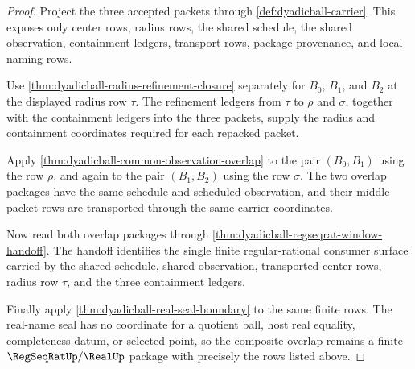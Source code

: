 \begin{proof}
Project the three accepted packets through \autoref{def:dyadicball-carrier}.
This exposes only center rows, radius rows, the shared schedule, the shared
observation, containment ledgers, transport rows, package provenance, and local
naming rows.

Use \autoref{thm:dyadicball-radius-refinement-closure} separately for $B_0$,
$B_1$, and $B_2$ at the displayed radius row $\tau$. The refinement ledgers
from $\tau$ to $\rho$ and $\sigma$, together with the containment ledgers into
the three packets, supply the radius and containment coordinates required for
each repacked packet.

Apply \autoref{thm:dyadicball-common-observation-overlap} to the pair
$(B_0,B_1)$ using the row $\rho$, and again to the pair $(B_1,B_2)$ using the
row $\sigma$. The two overlap packages have the same schedule and scheduled
observation, and their middle packet rows are transported through the same
carrier coordinates.

Now read both overlap packages through
\autoref{thm:dyadicball-regseqrat-window-handoff}. The handoff identifies the
single finite regular-rational consumer surface carried by the shared schedule,
shared observation, transported center rows, radius row $\tau$, and the three
containment ledgers.

Finally apply \autoref{thm:dyadicball-real-seal-boundary} to the same finite
rows. The real-name seal has no coordinate for a quotient ball, host real
equality, completeness datum, or selected point, so the composite overlap
remains a finite $\RegSeqRatUp/\RealUp$ package with precisely the rows listed
above.
\end{proof}

